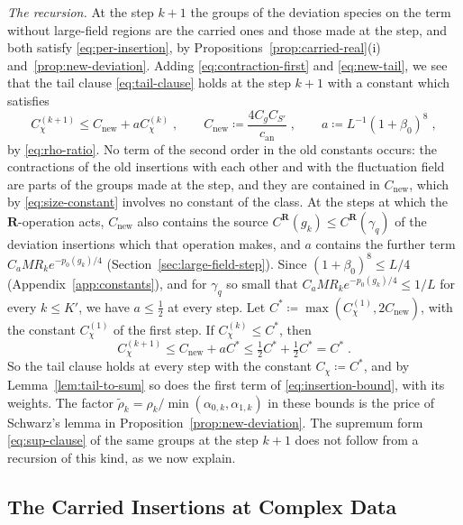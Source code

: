 \documentclass[11pt]{preprint}
\numberwithin{equation}{section}
\theoremstyle{definition}
\theoremstyle{remark}
\theoremstyle{plain}
\begin{document}
\emph{The recursion.} At the step $k + 1$ the groups of the deviation species on the term without large-field regions are the carried ones and those made at the step, and both satisfy \eqref{eq:per-insertion}, by Propositions~\ref{prop:carried-real}(i) and~\ref{prop:new-deviation}. Adding \eqref{eq:contraction-first} and \eqref{eq:new-tail}, we see that the tail clause \eqref{eq:tail-clause} holds at the step $k + 1$ with a constant which satisfies
\begin{equation}\label{eq:deviation-recursion}
    C^{(k+1)}_\chi \leq C_{\mathrm{new}} + aC^{(k)}_\chi\;,
    \qquad
    C_{\mathrm{new}} \coloneqq \frac{4C_gC_{S'}}{c_{\mathrm{an}}}\;,
    \qquad
    a \coloneqq L^{-1}(1 + \beta_0)^8\;,
\end{equation}
by \eqref{eq:rho-ratio}. No term of the second order in the old constants occurs: the contractions of the old insertions with each other and with the fluctuation field are parts of the groups made at the step, and they are contained in $C_{\mathrm{new}}$, which by \eqref{eq:size-constant} involves no constant of the class. At the steps at which the $\mathbf R$-operation acts, $C_{\mathrm{new}}$ also contains the source $C^{\mathbf R}(g_k) \leq C^{\mathbf R}(\gamma_q)$ of the deviation insertions which that operation makes, and $a$ contains the further term $C_aMR_ke^{-p_0(g_k)/4}$ (Section~\ref{sec:large-field-step}). Since $(1 + \beta_0)^8 \leq L/4$ (Appendix~\ref{app:constants}), and for $\gamma_q$ so small that $C_aMR_ke^{-p_0(g_k)/4} \leq 1/L$ for every $k \leq K'$, we have $a \leq \frac12$ at every step. Let $C^* \coloneqq \max(C^{(1)}_\chi, 2C_{\mathrm{new}})$, with the constant $C^{(1)}_\chi$ of the first step. If $C^{(k)}_\chi \leq C^*$, then
\begin{equation}\label{eq:recursion-fixed-point}
    C^{(k+1)}_\chi \leq C_{\mathrm{new}} + aC^* \leq \tfrac12C^* + \tfrac12C^* = C^*\;.
\end{equation}
So the tail clause holds at every step with the constant $C_\chi \coloneqq C^*$, and by Lemma~\ref{lem:tail-to-sum} so does the first term of \eqref{eq:insertion-bound}, with its weights. The factor $\tilde\rho_k = \rho_k/\min(\alpha_{0,k}, \alpha_{1,k})$ in these bounds is the price of Schwarz's lemma in Proposition~\ref{prop:new-deviation}. The supremum form \eqref{eq:sup-clause} of the same groups at the step $k + 1$ does not follow from a recursion of this kind, as we now explain.

\subsection{The Carried Insertions at Complex Data}\label{sec:carried-complex}
\end{document}
